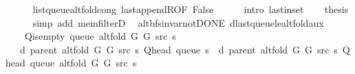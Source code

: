 \begin{isabellebody}
\ \ \ \ \isamarkupfalse%
\ list{\isacharunderscore}{\kern0pt}queue{\isacharunderscore}{\kern0pt}alt{\isacharunderscore}{\kern0pt}fold{\isacharunderscore}{\kern0pt}cong\ last{\isacharunderscore}{\kern0pt}appendR{\isacharbrackleft}{\kern0pt}OF\ False{\isacharbrackright}{\kern0pt}\isanewline
\ \ \ \ \isamarkupfalse%
\ {\isacharparenleft}{\kern0pt}intro\ last{\isacharunderscore}{\kern0pt}in{\isacharunderscore}{\kern0pt}set{\isacharparenright}{\kern0pt}\isanewline
\ \ \isamarkupfalse%
\ {\isacharquery}{\kern0pt}thesis\isanewline
\ \ \ \ \isamarkupfalse%
\ {\isacharparenleft}{\kern0pt}simp\ add{\isacharcolon}{\kern0pt}\ mem{\isacharunderscore}{\kern0pt}filterD{\isacharparenleft}{\kern0pt}{}{\isacharparenright}{\kern0pt}{\isacharparenright}{\kern0pt}\isanewline
{}\isamarkupfalse%
%
\endisatagproof
{\isafoldproof}%
%
\isadelimproof
\isanewline
%
\endisadelimproof
\isanewline
{}\isamarkupfalse%
\ {\isacharparenleft}{\kern0pt}\ alt{\isacharunderscore}{\kern0pt}bfs{\isacharunderscore}{\kern0pt}invar{\isacharunderscore}{\kern0pt}not{\isacharunderscore}{\kern0pt}DONE{\isacharparenright}{\kern0pt}\ d{\isacharunderscore}{\kern0pt}last{\isacharunderscore}{\kern0pt}queue{\isacharunderscore}{\kern0pt}le{\isacharunderscore}{\kern0pt}alt{\isacharunderscore}{\kern0pt}fold{\isacharunderscore}{\kern0pt}aux{\isacharunderscore}{\kern0pt}{}{\isacharcolon}{\kern0pt}\isanewline
\ \ \ {\isachardoublequoteopen}{\isasymnot}\ Q{\isacharunderscore}{\kern0pt}is{\isacharunderscore}{\kern0pt}empty\ {\isacharparenleft}{\kern0pt}queue\ {\isacharparenleft}{\kern0pt}alt{\isacharunderscore}{\kern0pt}fold\ G{}\ G{}\ src\ s{\isacharparenright}{\kern0pt}{\isacharparenright}{\kern0pt}{\isachardoublequoteclose}\isanewline
\ \ \ {\isachardoublequoteopen}d\ {\isacharparenleft}{\kern0pt}parent\ {\isacharparenleft}{\kern0pt}alt{\isacharunderscore}{\kern0pt}fold\ G{}\ G{}\ src\ s{\isacharparenright}{\kern0pt}{\isacharparenright}{\kern0pt}\ {\isacharparenleft}{\kern0pt}Q{\isacharunderscore}{\kern0pt}head\ {\isacharparenleft}{\kern0pt}queue\ s{\isacharparenright}{\kern0pt}{\isacharparenright}{\kern0pt}\ {\isasymle}\ d\ {\isacharparenleft}{\kern0pt}parent\ {\isacharparenleft}{\kern0pt}alt{\isacharunderscore}{\kern0pt}fold\ G{}\ G{}\ src\ s{\isacharparenright}{\kern0pt}{\isacharparenright}{\kern0pt}\ {\isacharparenleft}{\kern0pt}Q{\isacharunderscore}{\kern0pt}head\ {\isacharparenleft}{\kern0pt}queue\ {\isacharparenleft}{\kern0pt}alt{\isacharunderscore}{\kern0pt}fold\ G{}\ G{}\ src\ s{\isacharparenright}{\kern0pt}{\isacharparenright}{\kern0pt}{\isacharparenright}{\kern0pt}{\isachardoublequoteclose}\isanewline

\end{isabellebody}
